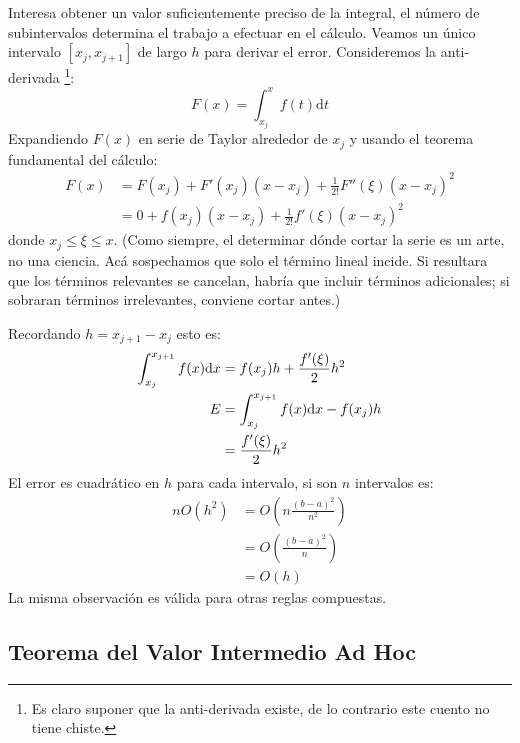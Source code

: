   Interesa obtener un valor suficientemente preciso de la integral,
  el número de subintervalos determina el trabajo a efectuar en el cálculo.
  Veamos un único intervalo \([x_j, x_{j + 1}]\)
  de largo \(h\) para derivar el error.
  Consideremos la anti-derivada%
    \footnote{Es claro suponer que la anti-derivada existe,
              de lo contrario este cuento no tiene chiste.}:
  \begin{equation*}
    F(x)
      = \int_{x_j}^{x} f(t) \mathrm{d} t
  \end{equation*}
  Expandiendo \(F(x)\) en serie de Taylor alrededor de \(x_j\)
  y usando el teorema fundamental del cálculo:
  \begin{align*}
    F(x)
      &= F(x_j)
          + F'(x_j) (x - x_j)
          + \frac{1}{2!} F''(\xi) (x - x_j)^2 \\
      &= 0 + f(x_j) (x - x_j) + \frac{1}{2!} f'(\xi) (x - x_j)^2
  \end{align*}
  donde \(x_j \le \xi \le x\).
  (Como siempre,
   el determinar dónde cortar la serie es un arte,
   no una ciencia.
   Acá sospechamos que solo el término lineal incide.
   Si resultara que los términos relevantes se cancelan,
   habría que incluir términos adicionales;
   si sobraran términos irrelevantes,
   conviene cortar antes.)

  Recordando \(h = x_{j + 1} - x_j\)
  esto es:
  \begin{align}
    \int_{x_j}^{x_{j + 1}} f(x) \mathrm{d} x
      &= f(x_j) h
           + \frac{f'(\xi)}{2} h^2 \notag \\
    E
      &= \int_{x_j}^{x_{j + 1}} f(x) \mathrm{d} x - f(x_j) h \notag \\
      &= \frac{f'(\xi)}{2} h^2
           \label{eq:E-initial-point}
  \end{align}
  El error es cuadrático en \(h\)
  para cada intervalo,
  si son \(n\) intervalos es:
  \begin{align*}
    n O(h^2)
      &= O\left( n \frac{(b - a)^2}{n^2} \right) \\
      &= O\left( \frac{(b - a)^2}{n} \right) \\
      &= O(h)
  \end{align*}
  La misma observación es válida para otras reglas compuestas.

\subsection{Teorema del Valor Intermedio Ad Hoc}


